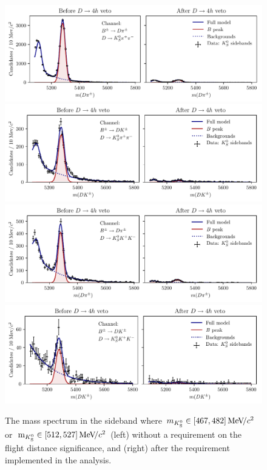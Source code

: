\begin{figure}[tbp]
    \centering
    \includegraphics[width=0.95\columnwidth]{figures/analysis/background_checks/ks_fd_check_Pi_PiPi.pdf}
    \includegraphics[width=0.95\columnwidth]{figures/analysis/background_checks/ks_fd_check_K_PiPi.pdf}
    \includegraphics[width=0.95\columnwidth]{figures/analysis/background_checks/ks_fd_check_Pi_KK.pdf}
    \includegraphics[width=0.95\columnwidth]{figures/analysis/background_checks/ks_fd_check_K_KK.pdf}
    \caption{The \B mass spectrum in the \KS sideband where $m_{{K}^0_{\mathrm{S}}}\in[467, 482]\text{\,Me\kern -0.1em V\!/}c^2$ or $\text{\,m}_{{K}^0_{\mathrm{S}}}\in[512,527]\text{\,Me\kern -0.1em V\!/}c^2$ (left) without a requirement on the \KS flight distance significance, and (right) after the requirement implemented in the analysis.}
    \label{fig:fake_ks}
\end{figure}

